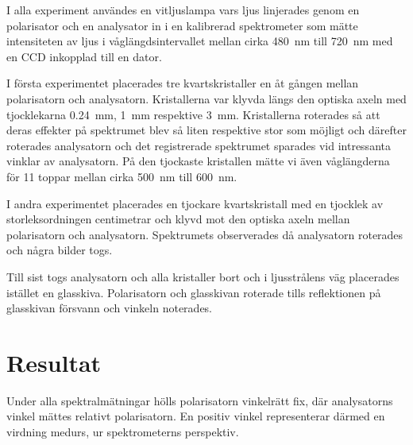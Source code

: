 \documentclass[a4paper]{article}
\begin{document}
  I alla experiment användes en vitljuslampa vars ljus linjerades genom en polarisator och en analysator in i en kalibrerad spektrometer som mätte intensiteten av ljus i våglängdsintervallet mellan cirka \SI{480}{\nano\meter} till \SI{720}{\nano\meter} med en CCD inkopplad till en dator.
  
  I första experimentet placerades tre kvartskristaller en åt gången mellan polarisatorn och analysatorn. Kristallerna var klyvda längs den optiska axeln med tjocklekarna \SI{0.24}{\milli\meter}, \SI{1}{\milli\meter} respektive \SI{3}{\milli\meter}. Kristallerna roterades så att deras effekter på spektrumet blev så liten respektive stor som möjligt och därefter roterades analysatorn och det registrerade spektrumet sparades vid intressanta vinklar av analysatorn. På den tjockaste kristallen mätte vi även våglängderna för 11 toppar mellan cirka \SI{500}{\nano\meter} till \SI{600}{\nano\meter}.
  
  I andra experimentet placerades en tjockare kvartskristall med en tjocklek av storleksordningen centimetrar och klyvd mot den optiska axeln mellan polarisatorn och analysatorn. Spektrumets observerades då analysatorn roterades och några bilder togs.
  
  Till sist togs analysatorn och alla kristaller bort och i ljusstrålens väg placerades istället en glasskiva. Polarisatorn och glasskivan roterade tills reflektionen på glasskivan försvann och vinkeln noterades.

\section{Resultat}




Under alla spektralmätningar hölls polarisatorn vinkelrätt fix, där analysatorns vinkel mättes relativt polarisatorn. En positiv vinkel representerar därmed en virdning medurs, ur spektrometerns perspektiv.
\end{document}
